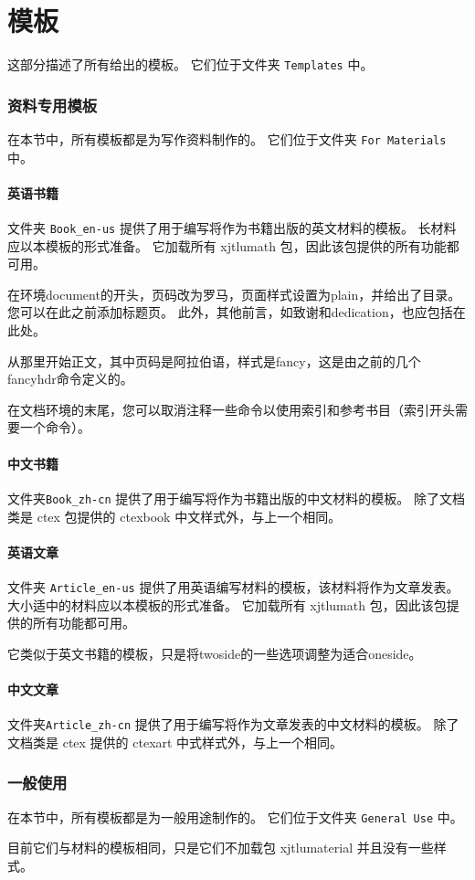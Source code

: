 \part{模板}
这部分描述了所有给出的模板。 它们位于文件夹 \verb|Templates| 中。
\section{资料专用模板}
在本节中，所有模板都是为写作资料制作的。 它们位于文件夹 \verb|For Materials| 中。
\subsection{英语书籍}
文件夹 \verb=Book_en-us= 提供了用于编写将作为书籍出版的英文材料的模板。 长材料应以本模板的形式准备。 它加载所有 xjtlumath 包，因此该包提供的所有功能都可用。

在环境document的开头，页码改为罗马，页面样式设置为plain，并给出了目录。 您可以在此之前添加标题页。 此外，其他前言，如致谢和dedication，也应包括在此处。

从那里开始正文，其中页码是阿拉伯语，样式是fancy，这是由之前的几个fancyhdr命令定义的。

在文档环境的末尾，您可以取消注释一些命令以使用索引和参考书目（索引开头需要一个命令）。

\subsection{中文书籍}
文件夹\verb=Book_zh-cn= 提供了用于编写将作为书籍出版的中文材料的模板。 除了文档类是 ctex 包提供的 ctexbook 中文样式外，与上一个相同。

\subsection{英语文章}
文件夹 \verb=Article_en-us= 提供了用英语编写材料的模板，该材料将作为文章发表。 大小适中的材料应以本模板的形式准备。 它加载所有 xjtlumath 包，因此该包提供的所有功能都可用。

它类似于英文书籍的模板，只是将twoside的一些选项调整为适合oneside。

\subsection{中文文章}
文件夹\verb=Article_zh-cn= 提供了用于编写将作为文章发表的中文材料的模板。 除了文档类是 ctex 提供的 ctexart 中式样式外，与上一个相同。

\section{一般使用}
在本节中，所有模板都是为一般用途制作的。 它们位于文件夹 \verb|General Use| 中。

目前它们与材料的模板相同，只是它们不加载包 xjtlumaterial 并且没有一些样式。
